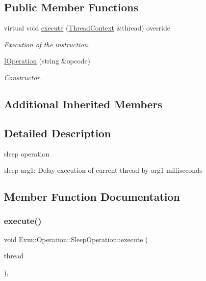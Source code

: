\subsection*{Public Member Functions}
\begin{DoxyCompactItemize}
\item 
virtual void \mbox{\hyperlink{struct_evm_1_1_operation_1_1_sleep_operation_a12fd1e8e636dd9e9bc571c6769b6f926}{execute}} (\mbox{\hyperlink{struct_evm_1_1_thread_context}{Thread\+Context}} \&thread) override
\begin{DoxyCompactList}\small\item\em Execution of the instruction. \end{DoxyCompactList}\item 
\mbox{\hyperlink{struct_evm_1_1_operation_1_1_sleep_operation_a65e98ee1b1679e12c1d1dd000ebfe937}{I\+Operation}} (string \&opcode)
\begin{DoxyCompactList}\small\item\em Constructor. \end{DoxyCompactList}\end{DoxyCompactItemize}
\subsection*{Additional Inherited Members}


\subsection{Detailed Description}
sleep operation 

sleep arg1; Delay execution of current thread by arg1 milliseconds 

\subsection{Member Function Documentation}
\mbox{\label{struct_evm_1_1_operation_1_1_sleep_operation_a12fd1e8e636dd9e9bc571c6769b6f926}} 
\subsubsection{\texorpdfstring{execute()}{execute()}}
{\footnotesize\ttfamily void Evm\+::\+Operation\+::\+Sleep\+Operation\+::execute (\begin{DoxyParamCaption}\item[{\mbox{\hyperlink{struct_evm_1_1_thread_context}{Thread\+Context}} \&}]{thread }\end{DoxyParamCaption})\hspace{0.3cm}{\ttfamily [override]}, {\ttfamily [virtual]}}



